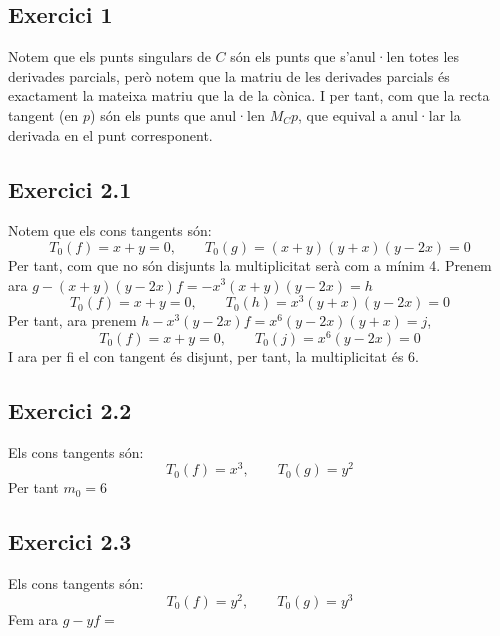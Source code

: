 \documentclass[11pt, a4paper]{article}
\begin{document}
\subsection{Exercici 1}
Notem que els punts singulars de $C$ són els punts que s'anul·len totes les derivades parcials, però notem que la matriu de les derivades parcials és exactament la mateixa matriu que la de la cònica. I per tant, com que la recta tangent (en $p$) són els punts que anul·len $M_Cp$, que equival a anul·lar la derivada en el punt corresponent.
\subsection{Exercici 2.1}
Notem que els cons tangents són:
\[
    T_0(f) = x+y=0,\qquad T_0(g) = (x+y)(y+x)(y-2x) = 0
\]
Per tant, com que no són disjunts la multiplicitat serà com a mínim 4. Prenem ara $g-(x+y)(y-2x)f = -x^3(x+y)(y-2x)=h$
\[
    T_0(f) = x+y=0,\qquad T_0(h) = x^3(y+x)(y-2x) = 0
\]
Per tant, ara prenem $h-x^3(y-2x)f=x^6(y-2x)(y+x)=j$,
\[
    T_0(f) = x+y=0,\qquad T_0(j) = x^6(y-2x) = 0
\]
I ara per fi el con tangent és disjunt, per tant, la multiplicitat és 6.
\subsection{Exercici 2.2}
Els cons tangents són:
\[
    T_0(f)=x^3, \qquad T_0(g) = y^2
\]
Per tant $m_0=6$
\subsection{Exercici 2.3}
Els cons tangents són:
\[
    T_0(f)=y^2, \qquad T_0(g) = y^3
\]
Fem ara $g-yf = $
\end{document}
